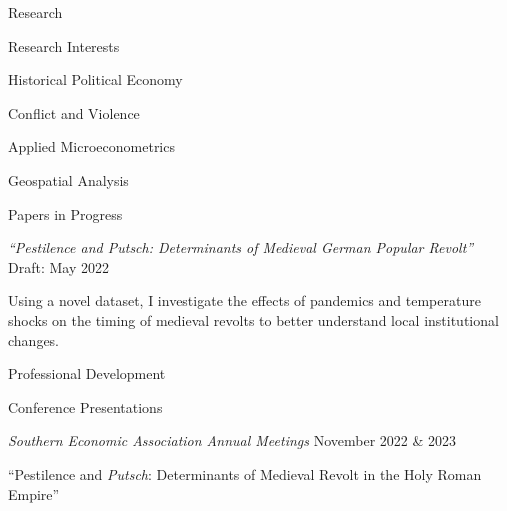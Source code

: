 \documentclass{resume} %
\begin{document}
\begin{rSection}{Research}

    \begin{rSubsection}{Research Interests}{}{}{}
        \item Historical Political Economy
        \item Conflict and Violence
        \item Applied Microeconometrics
        \item Geospatial Analysis
    \end{rSubsection}
    \vspace{-1mm} %
    \begin{rSubsection}{Papers in Progress}{}{}{}
        \item[] \hspace{-5mm} \textit{``Pestilence and \textrm{Putsch}: Determinants of Medieval German Popular Revolt''} \hfill{Draft: May 2022}
        \item Using a novel dataset, I investigate the effects of pandemics and temperature shocks on the timing of medieval revolts to better understand local institutional changes.
    \end{rSubsection}

\end{rSection}


\begin{rSection}{Professional Development}

    \begin{rSubsection}{Conference Presentations}{}{}{}
        \item[] \hspace{-5mm} \textit{Southern Economic Association Annual Meetings} \hfill{November 2022 \& 2023}
        \item ``Pestilence and \textit{Putsch}: Determinants of Medieval Revolt in the Holy Roman Empire''
    \end{rSubsection}

\end{rSection}
\end{document}
